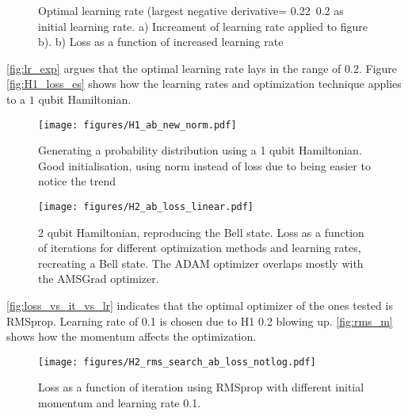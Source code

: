 \documentclass[../main.tex]{subfiles}
\begin{document}
\begin{figure}%
    \centering
    \hspace*{-0.1\textwidth}
    \caption{Optimal learning rate (largest negative derivative= 0.22~0.2 as initial learning rate. a) Increament of learning rate applied to figure b). b) Loss as a function of increased learning rate}%
    \label{fig:lr_exp}%
\end{figure}

\autoref{fig:lr_exp} argues that the optimal learning rate lays in the range of $0.2$. Figure \autoref{fig:H1_loss_es} shows how the learning rates and optimization technique applies to a $1$ qubit Hamiltonian.

\begin{figure}
    \begin{center}
        \texttt{[image: figures/H1\_ab\_new\_norm.pdf]}
        \caption{Generating a probability distribution using a 1 qubit Hamiltonian. Good initialisation, using norm instead of loss due to being easier to notice the trend}
        \label{fig:H1_loss_es}
    \end{center}
\end{figure}

\begin{figure}
    \begin{center}
        \texttt{[image: figures/H2\_ab\_loss\_linear.pdf]}
        \caption{2 qubit Hamiltonian, reproducing the Bell state. Loss as a function of iterations for different optimization methods and learning rates, recreating a Bell state. The ADAM optimizer overlaps mostly with the AMSGrad optimizer.}
        \label{fig:loss_vs_it_vs_lr}
    \end{center}
\end{figure}

\autoref{fig:loss_vs_it_vs_lr} indicates that the optimal optimizer of the ones tested is RMSprop. Learning rate of 0.1 is chosen due to H1 0.2 blowing up. \autoref{fig:rms_m} shows how the momentum affects the optimization.

\begin{figure}
    \begin{center}
        \texttt{[image: figures/H2\_rms\_search\_ab\_loss\_notlog.pdf]}
        \caption{Loss as a function of iteration using RMSprop with different initial momentum and learning rate 0.1.}
        \label{fig:rms_m}
    \end{center}
\end{figure}
\end{document}
